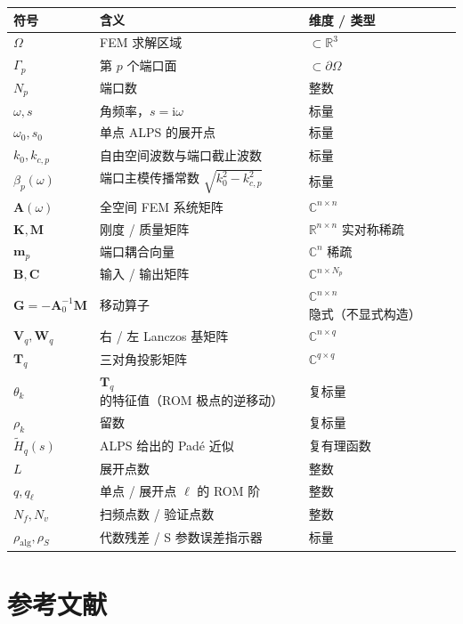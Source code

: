 \documentclass[11pt,a4paper]{ctexart}
\newcommand{\R}{\mathbb{R}}
\newcommand{\C}{\mathbb{C}}
\newcommand{\im}{\mathrm{i}}
\begin{document}
\begin{table}[h]
\centering
\begin{tabular}{lll}
\toprule
符号 & 含义 & 维度 / 类型 \\
\midrule
$\Omega$ & FEM 求解区域 & $\subset \R^3$ \\
$\Gamma_p$ & 第 $p$ 个端口面 & $\subset \partial\Omega$ \\
$N_p$ & 端口数 & 整数 \\
$\omega,s$ & 角频率，$s = \im\omega$ & 标量 \\
$\omega_0,s_0$ & 单点 ALPS 的展开点 & 标量 \\
$k_0,k_{c,p}$ & 自由空间波数与端口截止波数 & 标量 \\
$\beta_p(\omega)$ & 端口主模传播常数 $\sqrt{k_0^2-k_{c,p}^2}$ & 标量 \\
$\bm A(\omega)$ & 全空间 FEM 系统矩阵 & $\C^{n\times n}$ \\
$\bm K,\bm M$ & 刚度 / 质量矩阵 & $\R^{n\times n}$ 实对称稀疏 \\
$\bm m_p$ & 端口耦合向量 & $\C^{n}$ 稀疏 \\
$\bm B,\bm C$ & 输入 / 输出矩阵 & $\C^{n\times N_p}$ \\
$\bm G = -\bm A_0^{-1}\bm M$ & 移动算子 & $\C^{n\times n}$ 隐式（不显式构造） \\
$\bm V_q,\bm W_q$ & 右 / 左 Lanczos 基矩阵 & $\C^{n\times q}$ \\
$\bm T_q$ & 三对角投影矩阵 & $\C^{q\times q}$ \\
$\theta_k$ & $\bm T_q$ 的特征值（ROM 极点的逆移动） & 复标量 \\
$\rho_k$ & 留数 & 复标量 \\
$\widetilde H_q(s)$ & ALPS 给出的 Padé 近似 & 复有理函数 \\
$L$ & 展开点数 & 整数 \\
$q,q_\ell$ & 单点 / 展开点 $\ell$ 的 ROM 阶 & 整数 \\
$N_f,N_v$ & 扫频点数 / 验证点数 & 整数 \\
$\rho_{\mathrm{alg}},\rho_S$ & 代数残差 / S 参数误差指示器 & 标量 \\
\bottomrule
\end{tabular}
\end{table}

\section{参考文献}
\end{document}
